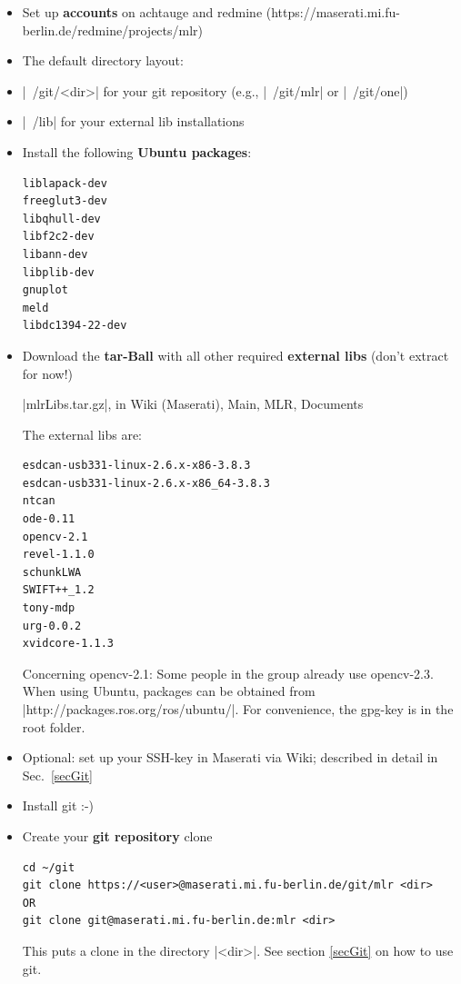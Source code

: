 \begin{itemize}
\item Set up \textbf{accounts} on achtauge and redmine
   (https://maserati.mi.fu-berlin.de/redmine/projects/mlr)

\item The default directory layout:
\bi
\item |~/git/<dir>| for your git repository (e.g., |~/git/mlr| or
|~/git/one|)
\item |~/lib| for your external lib installations
\ei

\item Install the following \textbf{Ubuntu packages}:
\begin{code}
\begin{verbatim}
liblapack-dev
freeglut3-dev
libqhull-dev
libf2c2-dev
libann-dev
libplib-dev
gnuplot
meld
libdc1394-22-dev
\end{verbatim}
\end{code}


\item Download the \textbf{tar-Ball} with all other required
\textbf{external libs} (don't extract for now!)

|mlrLibs.tar.gz|, in Wiki (Maserati), Main, MLR, Documents

The external libs are:
\begin{code}
\begin{verbatim}
esdcan-usb331-linux-2.6.x-x86-3.8.3
esdcan-usb331-linux-2.6.x-x86_64-3.8.3
ntcan
ode-0.11
opencv-2.1
revel-1.1.0
schunkLWA
SWIFT++_1.2
tony-mdp
urg-0.0.2
xvidcore-1.1.3
\end{verbatim}
\end{code}
Concerning opencv-2.1: Some people in the group already use opencv-2.3.
When using Ubuntu, packages can be obtained from
|http://packages.ros.org/ros/ubuntu/|. For convenience, the gpg-key
is in the root folder.


\item Optional: set up your SSH-key in Maserati via Wiki; described in
detail in Sec.~\ref{secGit}


\item Install git :-)


\item Create your \textbf{git repository} clone
\begin{code}
\begin{verbatim}
cd ~/git
git clone https://<user>@maserati.mi.fu-berlin.de/git/mlr <dir>
OR
git clone git@maserati.mi.fu-berlin.de:mlr <dir>
\end{verbatim}
\end{code}
This puts a clone in the directory |<dir>|. See section \ref{secGit} on
how to use git.



\end{itemize}
